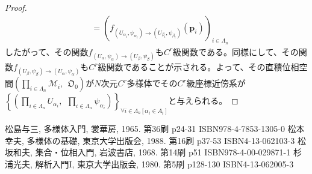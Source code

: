 \documentclass[dvipdfmx]{jsarticle}
\begin{document}
\begin{proof}
\begin{align*}
&= \left( f_{\left( U_{\alpha_{i}},\psi_{\alpha_{i}} \right) \rightarrow \left( U_{\beta_{i}},\psi_{\beta_{i}} \right)}\left( \mathbf{p}_{i} \right) \right)_{i \in \varLambda_{n}}
\end{align*}
したがって、その関数$f_{\left( U_{\alpha},\psi_{\alpha} \right) \rightarrow \left( U_{\beta},\psi_{\beta} \right)}$も$C^{r}$級関数である。同様にして、その関数$f_{\left( U_{\beta},\psi_{\beta} \right) \rightarrow \left( U_{\alpha},\psi_{\alpha} \right)}$も$C^{r}$級関数であることが示される。よって、その直積位相空間$\left( \prod_{i \in \varLambda_{n}} \mathcal{M}_{i},\ \ \mathfrak{O}_{0} \right)がN$次元$C^{r}$多様体でその$C^{r}$級座標近傍系が$\left\{ \left( \prod_{i \in \varLambda_{n}} U_{\alpha_{i}},\ \ \prod_{i \in \varLambda_{n}} \psi_{\alpha_{i}} \right) \right\}_{\forall i \in \varLambda_{n}\left[ \alpha_{i} \in A_{i} \right]}$と与えられる。
\end{proof}
\begin{thebibliography}{50}
  松島与三, 多様体入門, 裳華房, 1965. 第36刷 p24-31 ISBN978-4-7853-1305-0
  松本幸夫, 多様体の基礎, 東京大学出版会, 1988. 第16刷 p37-53 ISBN4-13-062103-3
  松坂和夫, 集合・位相入門, 岩波書店, 1968. 第14刷 p51 ISBN978-4-00-029871-1
  杉浦光夫, 解析入門I, 東京大学出版会, 1980. 第5刷 p128-130 ISBN4-13-062005-3
\end{thebibliography}
\end{document}
